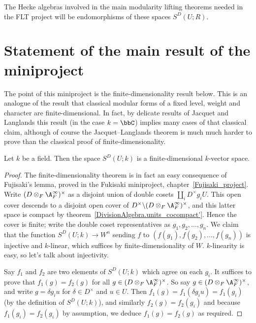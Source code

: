 The Hecke algebras involved in the main modularity lifting
theorems needed in the FLT project will be endomorphisms of these spaces $S^D(U;R)$.

\section{Statement of the main result of the miniproject}

The point of this miniproject is the finite-dimensionality result below.
This is an analogue of the result that classical modular forms of a fixed
level, weight and character are finite-dimensional. In fact, by delicate results
of Jacquet and Langlands this result (in the case $k=\bbC$) implies many cases of that classical claim,
although of course the Jacquet--Langlands theorem is much much harder to prove than the classical
proof of finite-dimensionality.


\begin{theorem}
  \label{TotallyDefiniteQuaternionAlgebra.WeightTwoAutomorphicForm.finiteDimensional}
  Let $k$ be a field. Then the space $S^D(U;k)$ is a finite-dimensional $k$-vector space.
\end{theorem}



\begin{proof}
  The finite-dimensionality theorem is in fact an easy consequence of Fujisaki's lemma,
  proved in the Fukisaki miniproject, chapter~\ref{Fujisaki_project}.
  Write $(D\otimes_F\A_F^\infty)^\times$ as a disjoint union of double cosets
  $\coprod_i D^\times g_i U$. This open cover descends to a disjoint open
  cover of $D^\times\backslash (D\otimes_F\A_F^\infty)^\times$,
  and this latter space is compact by theorem~\ref{DivisionAlgebra.units_cocompact'}.
  Hence the cover is finite; write the double coset representatives
  as $g_1,g_2,\ldots,g_n$. We claim that
  the function $S^D(U;k)\to W^n$ sending $f$ to $(f(g_1),f(g_2),\ldots,f(g_n))$
  is injective and $k$-linear, which suffices by finite-dimensionality of $W$.
  $k$-linearity is easy, so let's talk about injectivity.

  Say $f_1$ and $f_2$ are two elements of $S^D(U;k)$ which agree on
  each $g_i$. It suffices to prove that $f_1(g)=f_2(g)$ for all
  $g\in(D\otimes_F\A_F^\infty)^\times$. So say $g\in(D\otimes_F\A_F^\infty)^\times$,
  and write $g=\delta g_iu$ for $\delta \in D^\times$ and $u\in U$.
  Then $f_1(g)=f_1(\delta g_iu)=f_1(g_i)$ (by the definition of $S^D(U;k)$), and similarly $f_2(g)=f_2(g_i)$
  and because $f_1(g_i)=f_2(g_i)$ by assumption, we deduce $f_1(g)=f_2(g)$ as required.
\end{proof}

